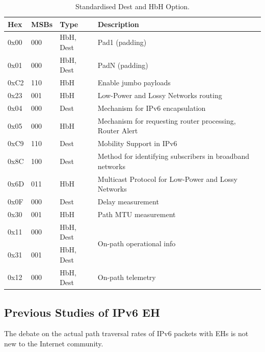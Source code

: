 \documentclass[conference]{IEEEtran}
\begin{document}
\begin{table}[b]
\center
\caption{Standardised Dest and HbH Option.}
\begin{tabular}{p{}|p{}|l|p{}}
Hex  & MSBs & Type      & Description                                              \\
\hline
\hline
0x00 & 000  & HbH, Dest & Pad1 (padding)                                           \\
0x01 & 000  & HbH, Dest & PadN (padding)                                           \\
0xC2 & 110  & HbH       & Enable jumbo payloads                                    \\
0x23 & 001  & HbH       & Low-Power and Lossy Networks routing                     \\
0x04 & 000  & Dest      & Mechanism for IPv6 encapsulation                 \\
0x05 & 000  & HbH       & Mechanism for requesting router processing, Router Alert              \\
0xC9 & 110  & Dest      & Mobility Support in IPv6                                 \\
0x8C & 100  & Dest      & Method for identifying subscribers in broadband networks \\
0x6D & 011  & HbH       & Multicast Protocol for Low-Power and  Lossy Networks     \\
0x0F & 000  & Dest      & Delay measurement                                        \\
0x30 & 001  & HbH       & Path MTU measurement                                     \\
0x11 & 000  & HbH, Dest & \multirow{2}{*}{On-path operational info}                \\
0x31 & 001  & HbH, Dest &                                                          \\
0x12 & 000  & HbH, Dest & On-path telemetry                                       
\end{tabular}
  \label{tbl:options}
\end{table}


\subsection{Previous Studies of IPv6 EH}

\label{sec:motivation}

The debate on the actual path traversal rates of IPv6 packets with EHs is not
new to the Internet community.
\end{document}
